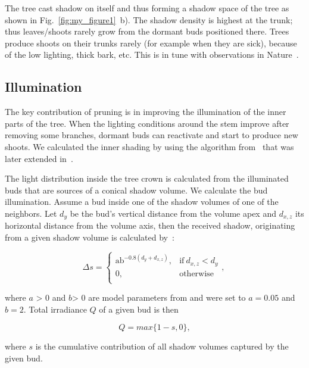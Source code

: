 The tree cast shadow on itself and thus
forming a shadow space of the tree as shown in Fig.~\ref{fig:my_figure1}~b). The shadow
density is highest at the trunk; thus leaves/shoots rarely grow from the
dormant buds positioned there. Trees produce shoots on their trunks rarely (for example when they are sick), because of the low lighting, thick bark, etc. This is in tune with observations in Nature~\cite{wohlleben2016hidden}.



\subsection{Illumination}
The key contribution of pruning is in
improving the illumination of the inner parts of the tree. When the
lighting conditions around the stem improve after removing some
branches, dormant buds can reactivate and start to produce new shoots. We calculated the inner shading by using the algorithm from~\cite{palubicki_self-organizing_2009}
that was later extended in~\cite{pirk_plastic_2012,stava_inverse_2014,strnad_novel_2017}. 

The light distribution
inside the tree crown is calculated from the illuminated buds that are
sources of a conical shadow volume. We calculate the bud illumination.
Assume a bud inside one of the shadow volumes of one of the
neighbors. Let \(d_{y}\) be the bud's vertical distance from the volume
apex and \(d_{x,z}\) its horizontal distance from the volume axis, then
the received shadow, originating from a given shadow volume is
calculated by~\cite{strnad_novel_2017}:
\begin{linenomath}
\begin{equation}
\Delta s = \left\{ \begin{matrix}
\text{ab}^{- 0.8\left( d_{y} + d_{x,z} \right)}, & \mathrm{\text{if}}\ d_{x,z} < d_{y} \\
0, & \mathrm{otherwise} \\
\end{matrix}, \right.\    
\end{equation}
\end{linenomath}
where \(a\) \textgreater{} 0 and \(b\)\textgreater{} 0 are model
parameters from \cite{palubicki_self-organizing_2009} and were set to \(a = 0.05\) and \(b = 2\).
Total irradiance $Q$ of a given bud is then
\begin{linenomath}
\begin{equation}
  Q = max\{1 - s, 0\},\label{eqn:q}  
\end{equation}
\end{linenomath}
where \(s\) is the cumulative contribution of all shadow volumes
captured by the given bud.

